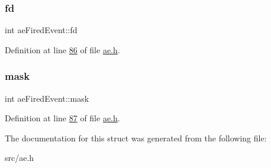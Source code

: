 \subsubsection{\texorpdfstring{fd}{fd}}
{\footnotesize\ttfamily int ae\+Fired\+Event\+::fd}



Definition at line \hyperlink{ae_8h_source_l00086}{86} of file \hyperlink{ae_8h_source}{ae.\+h}.

\mbox{\label{structaeFiredEvent_a2e9b1d9832d09a46c4a14e562aaa2aea}} 
\subsubsection{\texorpdfstring{mask}{mask}}
{\footnotesize\ttfamily int ae\+Fired\+Event\+::mask}



Definition at line \hyperlink{ae_8h_source_l00087}{87} of file \hyperlink{ae_8h_source}{ae.\+h}.



The documentation for this struct was generated from the following file\+:\begin{DoxyCompactItemize}
\item 
src/ae.\+h\end{DoxyCompactItemize}
